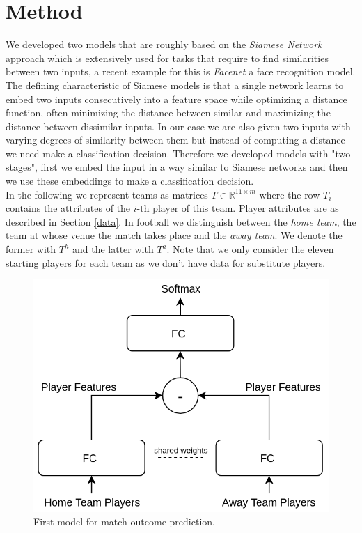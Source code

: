 \documentclass[a4paper]{article}
\begin{document}
\section{Method} \label{models}
We developed two models that are roughly based on the \textit{Siamese Network} approach
\cite{Bromley94} which is extensively used for tasks that require to find
similarities between two inputs, a recent example for this is \textit{Facenet}
\cite{Schroff15} a face recognition model. The defining characteristic of Siamese models is that a single network learns to embed two inputs consecutively into a feature space while optimizing a distance function, often minimizing the distance between similar and maximizing the distance between dissimilar inputs. In our case we are also given two inputs with varying degrees of similarity between them but instead of computing a distance we need make a classification decision. Therefore we developed models with "two stages", first we embed the input in a way similar to Siamese networks and then we use these embeddings to make a classification decision. \\
In the following we represent teams as matrices $T \in
\mathbb{R}^{11 \times m}$ where the row $T_i$ contains the attributes of the
$i$-th player of this team. Player attributes are as described in Section \ref{data}. In football we distinguish between the \emph{home team}, the team at whose venue the match takes place and the \emph{away team}. We denote the former with $T^h$ and
the latter with $T^a$. Note that we only consider the eleven
starting players for each team as we don't have data for substitute players. 

\begin{figure} 
\includegraphics[scale=0.30]{img/Siamese1.png}
\caption{First model for match outcome prediction.}
\label{fig:ffnet}
\end{figure}
\end{document}
